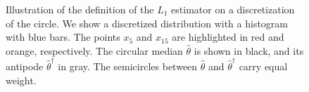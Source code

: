 \begin{figure}[h!]
\begin{tikzpicture}

\end{tikzpicture}


\caption{Illustration of the definition of the $L_1$ estimator on a discretization of the circle. We show a discretized distribution with a histogram with blue bars. The points $x_5$ and $x_{15}$ are highlighted in red and orange, respectively. The circular median $\widehat{\theta}$ is shown in black, and its antipode $\widehat{\theta}^\dagger$ in gray. The semicircles between $\widehat{\theta}$ and $\widehat{\theta}^\dagger$ carry equal weight.}
\end{figure}

